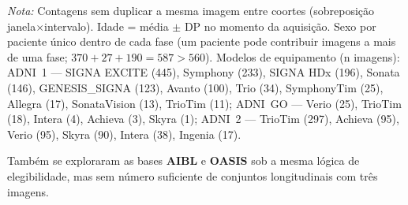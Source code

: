 \documentclass[review]{elsarticle}
\begin{document}
		\begin{table}[htbp]
		\centering
		\footnotesize
		\caption{Imagens T1w MP-RAGE por fase ADNI (união das quatro coortes de análise; imagens únicas por identificador de aquisição).}
		\label{tab:adni_study}
		\begin{flushleft}
		\footnotesize
		\textit{Nota:} Contagens sem duplicar a mesma imagem entre coortes (sobreposição janela$\times$intervalo).
		Idade = média $\pm$ DP no momento da aquisição.
		Sexo por paciente único dentro de cada fase (um paciente pode contribuir imagens a mais de uma fase; $370+27+190=587>560$).
		Modelos de equipamento (n imagens):
		ADNI~1 --- SIGNA EXCITE (445), Symphony (233), SIGNA HDx (196), Sonata (146), GENESIS\_SIGNA (123), Avanto (100), Trio (34), SymphonyTim (25), Allegra (17), SonataVision (13), TrioTim (11);
		ADNI~GO --- Verio (25), TrioTim (18), Intera (4), Achieva (3), Skyra (1);
		ADNI~2 --- TrioTim (297), Achieva (95), Verio (95), Skyra (90), Intera (38), Ingenia (17).
		\end{flushleft}
		\end{table}
		
		Também se exploraram as bases \textbf{AIBL} e \textbf{OASIS} sob a mesma lógica de elegibilidade, mas sem número suficiente de conjuntos longitudinais com três imagens.
		
\end{document}
